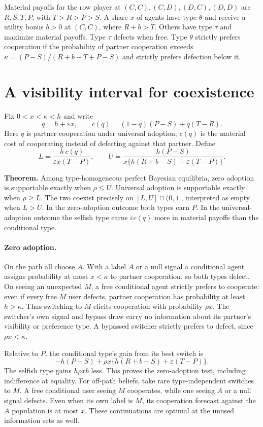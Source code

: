 \documentclass[11pt]{article}
\begin{document}
Material payoffs for the row player at $(C,C),(C,D),(D,C),(D,D)$ are $R,S,T,P$, with $T>R>P>S$. A share $x$ of agents have type $\theta$ and receive a utility bonus $b>0$ at $(C,C)$, where $R+b>T$. Others have type $\tau$ and maximize material payoffs. Type $\tau$ defects when free. Type $\theta$ strictly prefers cooperation if the probability of partner cooperation exceeds $\kappa=(P-S)/(R+b-T+P-S)$ and strictly prefers defection below it.

\newpage
\section{A visibility interval for coexistence}
Fix $0<x<\kappa<h$ and write
\[
 q=h+\varepsilon x,\qquad
 c(q)=(1-q)(P-S)+q(T-R).
\]
Here $q$ is partner cooperation under universal adoption; $c(q)$ is the material cost of cooperating instead of defecting against that partner. Define
\[
 L=\frac{h\,c(q)}{\varepsilon x(T-P)},\qquad
 U=\frac{h(P-S)}{x\{h(R+b-S)+\varepsilon(T-P)\}} .
\]

\textbf{Theorem.} Among type-homogeneous perfect Bayesian equilibria, zero adoption is supportable exactly when $\rho\le U$. Universal adoption is supportable exactly when $\rho\ge L$. The two coexist precisely on $[L,U]\cap(0,1]$, interpreted as empty when $L>U$. In the zero-adoption outcome both types earn $P$. In the universal-adoption outcome the selfish type earns $\varepsilon c(q)$ more in material payoffs than the conditional type.

\paragraph{Zero adoption.}
On the path all choose $A$. With a label $A$ or a null signal a conditional agent assigns probability at most $x<\kappa$ to partner cooperation, so both types defect. On seeing an unexpected $M$, a free conditional agent strictly prefers to cooperate: even if every free $M$ user defects, partner cooperation has probability at least $h>\kappa$. Thus switching to $M$ elicits cooperation with probability $\rho x$. The switcher's own signal and bypass draw carry no information about its partner's visibility or preference type. A bypassed switcher strictly prefers to defect, since $\rho x<\kappa$.

Relative to $P$, the conditional type's gain from its best switch is
\[
 -h(P-S)+\rho x\{h(R+b-S)+\varepsilon(T-P)\}.
\]
The selfish type gains $h\rho xb$ less. This proves the zero-adoption test, including indifference at equality. For off-path beliefs, take rare type-independent switches to $M$. A free conditional user seeing $M$ cooperates, while one seeing $A$ or a null signal defects. Even when its own label is $M$, its cooperation forecast against the $A$ population is at most $x$. These continuations are optimal at the unused information sets as well.
\end{document}

